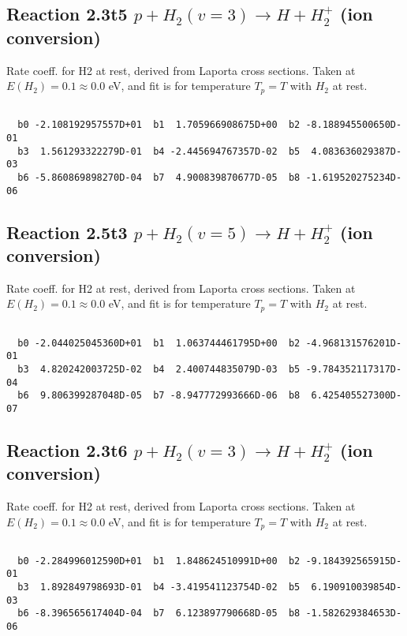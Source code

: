 \documentclass[12pt,dvipdfmx]{article}
\begin{document}
\newpage
\subsection{
Reaction 2.3t5
$ p + H_2(v=3) \rightarrow H + H_2^+$ (ion conversion)
}
Rate coeff. for H2 at rest, derived from Laporta cross sections.
Taken at $E(H_2) = 0.1 \approx 0.0$ eV,  and fit is for temperature $T_p=T$ with $H_2$ at rest.

\begin{small}\begin{verbatim}

  b0 -2.108192957557D+01  b1  1.705966908675D+00  b2 -8.188945500650D-01
  b3  1.561293322279D-01  b4 -2.445694767357D-02  b5  4.083636029387D-03
  b6 -5.860869898270D-04  b7  4.900839870677D-05  b8 -1.619520275234D-06

\end{verbatim}\end{small}

\newpage
\subsection{
Reaction 2.5t3
$ p + H_2(v=5) \rightarrow H + H_2^+$ (ion conversion)
}
Rate coeff. for H2 at rest, derived from Laporta cross sections.
Taken at $E(H_2) = 0.1 \approx 0.0$ eV,  and fit is for temperature $T_p=T$ with $H_2$ at rest.

\begin{small}\begin{verbatim}

  b0 -2.044025045360D+01  b1  1.063744461795D+00  b2 -4.968131576201D-01
  b3  4.820242003725D-02  b4  2.400744835079D-03  b5 -9.784352117317D-04
  b6  9.806399287048D-05  b7 -8.947772993666D-06  b8  6.425405527300D-07

\end{verbatim}\end{small}

\newpage
\subsection{
Reaction 2.3t6
$ p + H_2(v=3) \rightarrow H + H_2^+$ (ion conversion)
}
Rate coeff. for H2 at rest, derived from Laporta cross sections.
Taken at $E(H_2) = 0.1 \approx 0.0$ eV,  and fit is for temperature $T_p=T$ with $H_2$ at rest.

\begin{small}\begin{verbatim}

  b0 -2.284996012590D+01  b1  1.848624510991D+00  b2 -9.184392565915D-01
  b3  1.892849798693D-01  b4 -3.419541123754D-02  b5  6.190910039854D-03
  b6 -8.396565617404D-04  b7  6.123897790668D-05  b8 -1.582629384653D-06

\end{verbatim}\end{small}
\end{document}
